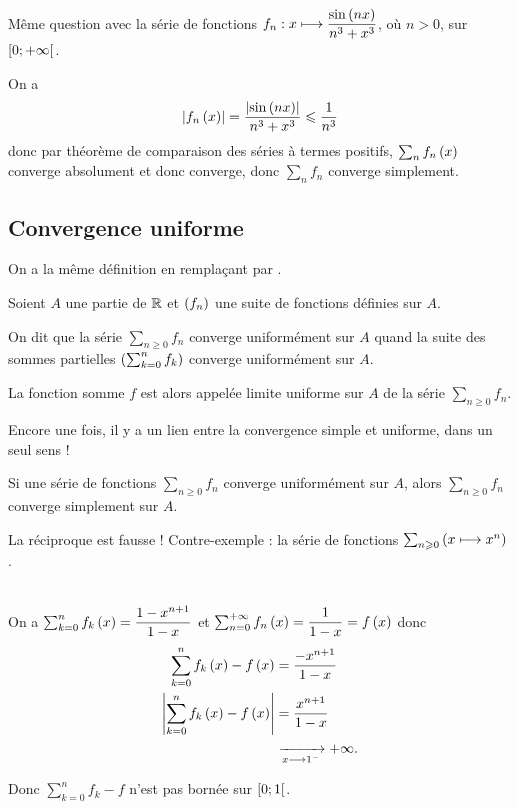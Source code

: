 \begin{exo}
Même question avec la série de fonctions \(f_n:x\longmapsto\dfrac{\sin\left(nx\right)}{n^3+x^3}\), où \(n>0\), sur \(\left[0;+\infty\right[\).
\end{exo}

\begin{corr}
On a \[\left\lvert f_n\left(x\right)\right\rvert=\dfrac{\left\lvert\sin\left(nx\right)\right\rvert}{n^3+x^3}\leqslant\dfrac{1}{n^3}\] donc par théorème de comparaison des séries à termes positifs, \(\sum_nf_n\left(x\right)\) converge absolument et donc converge, donc \(\sum_nf_n\) converge simplement.
\end{corr}

\subsection{Convergence uniforme}

On a la même définition en remplaçant  par .

\begin{defi}
Soient \(A\) une partie de \(\mathbb{R}\) et \(\left(f_n\right)\) une suite de fonctions définies sur \(A\).

On dit que la série \(\sum_{n\geq0}f_n\) converge uniformément sur \(A\) quand la suite des sommes partielles \(\left(\sum_{k=0}^nf_k\right)\) converge uniformément sur \(A\).

La fonction somme \(f\) est alors appelée limite uniforme sur \(A\) de la série \(\sum_{n\geq0}f_n\).
\end{defi}

Encore une fois, il y a un lien entre la convergence simple et uniforme, dans un seul sens !

\begin{theo}
Si une série de fonctions \(\sum_{n\geq0}f_n\) converge uniformément sur \(A\), alors \(\sum_{n\geq0}f_n\) converge simplement sur \(A\).
\end{theo}

La réciproque est fausse ! Contre-exemple : la série de fonctions \(\sum_{n\geqslant0}\left(x\longmapsto x^n\right)\).

\begin{dem}~\\
On a \(\sum_{k=0}^nf_k\left(x\right)=\dfrac{1-x^{n+1}}{1-x}\) et \(\sum_{n=0}^{+\infty}f_n\left(x\right)=\dfrac{1}{1-x}=f\left(x\right)\) donc \[\begin{aligned}
\sum_{k=0}^n f_k\left(x\right)-f\left(x\right)&=\dfrac{-x^{n+1}}{1-x} \\
\left\lvert\sum_{k=0}^nf_k\left(x\right)-f\left(x\right)\right\rvert&=\dfrac{x^{n+1}}{1-x} \\
&\xrightarrow[x\longrightarrow1^-]{}+\infty.
\end{aligned}\]

Donc \(\sum_{k=0}^nf_k-f\) n'est pas bornée sur \(\left[0;1\right[\).
\end{dem}

